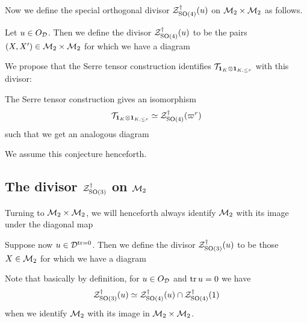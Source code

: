 Now we define the special orthogonal divisor $\mathcal Z^{\dagger}_{\operatorname{SO}(4)}(u)$
on $\mathcal M_2 \times \mathcal M_2$ as follows.
\begin{definition}
  Let $u \in O_\mathcal D$.
  Then we define the divisor $\mathcal Z^{\dagger}_{\operatorname{SO}(4)}(u)$ to be
  the pairs $(X, X') \in \mathcal M_2 \times \mathcal M_2$
  for which we have a diagram
  \begin{center}
  \end{center}
\end{definition}
We propose that the Serre tensor construction identifies $\mathcal{T}_{\mathbf{1}_K \otimes \mathbf{1}_{K, \le r}}$ with this divisor:
\begin{conjecture}
  \label{conj:serre_pullback_space}
  The Serre tensor construction gives an isomorphism
  \[ \mathcal{T}_{\mathbf{1}_K \otimes \mathbf{1}_{K, \le r}} \simeq \mathcal Z^{\dagger}_{\operatorname{SO}(4)}(\varpi^r) \]
  such that we get an analogous diagram
  \begin{center}
  \end{center}
\end{conjecture}
We assume this conjecture henceforth.

\subsection{The divisor $\mathcal Z^{\dagger}_{\operatorname{SO}(3)}$ on $\mathcal M_2$}
Turning to $\mathcal M_2 \times \mathcal M_2$, we will henceforth always identify $\mathcal M_2$
with its image under the diagonal map
\begin{center}
\end{center}

\begin{definition}
  Suppose now $u \in \mathcal D^{\operatorname{tr} = 0}$.
  Then we define the divisor $\mathcal Z^{\dagger}_{\operatorname{SO}(3)}(u)$ to be those $X \in \mathcal M_2$
  for which we have a diagram
  \begin{center}
  \end{center}
  Note that basically by definition, for $u \in O_\mathcal D$ and $\operatorname{tr} u = 0$ we have
  \[ \mathcal Z^{\dagger}_{\operatorname{SO}(3)}(u) \simeq \mathcal Z^{\dagger}_{\operatorname{SO}(4)}(u) \cap \mathcal Z^{\dagger}_{\operatorname{SO}(4)}(1) \]
  when we identify $\mathcal M_2$ with its image in $\mathcal M_2 \times \mathcal M_2$.
\end{definition}

